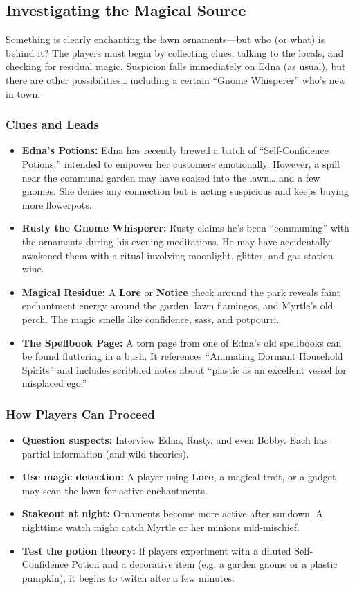 \subsection{Investigating the Magical Source}

Something is clearly enchanting the lawn ornaments—but who (or what) is behind it? The players must begin by collecting clues, talking to the locals, and checking for residual magic. Suspicion falls immediately on Edna (as usual), but there are other possibilities… including a certain “Gnome Whisperer” who’s new in town.

\subsubsection{Clues and Leads}
\begin{itemize}
    \item \textbf{Edna’s Potions:} Edna has recently brewed a batch of “Self-Confidence Potions,” intended to empower her customers emotionally. However, a spill near the communal garden may have soaked into the lawn… and a few gnomes. She denies any connection but is acting suspicious and keeps buying more flowerpots.
    \item \textbf{Rusty the Gnome Whisperer:} Rusty claims he’s been “communing” with the ornaments during his evening meditations. He may have accidentally awakened them with a ritual involving moonlight, glitter, and gas station wine.
    \item \textbf{Magical Residue:} A \textbf{Lore} or \textbf{Notice}  check around the park reveals faint enchantment energy around the garden, lawn flamingos, and Myrtle’s old perch. The magic smells like confidence, sass, and potpourri.
    \item \textbf{The Spellbook Page:} A torn page from one of Edna’s old spellbooks can be found fluttering in a bush. It references “Animating Dormant Household Spirits” and includes scribbled notes about “plastic as an excellent vessel for misplaced ego.”
\end{itemize}

\subsubsection{How Players Can Proceed}
\begin{itemize}
    \item \textbf{Question suspects:} Interview Edna, Rusty, and even Bobby. Each has partial information (and wild theories).
    \item \textbf{Use magic detection:} A player using \textbf{Lore}, a magical trait, or a gadget may scan the lawn for active enchantments.
    \item \textbf{Stakeout at night:} Ornaments become more active after sundown. A nighttime watch might catch Myrtle or her minions mid-mischief.
    \item \textbf{Test the potion theory:} If players experiment with a diluted Self-Confidence Potion and a decorative item (e.g. a garden gnome or a plastic pumpkin), it begins to twitch after a few minutes.
\end{itemize}

